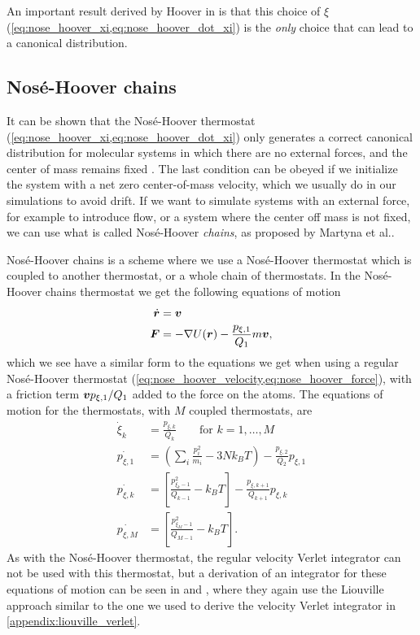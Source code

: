 An important result derived by Hoover in \cite{hoover1986constant} is that this choice of $\xi$ (\cref{eq:nose_hoover_xi,eq:nose_hoover_dot_xi}) is the \emph{only} choice that can lead to a canonical distribution.

\subsection{Nosé-Hoover chains\label{sec:nose_hoover_chain}}
It can be shown that the Nosé-Hoover thermostat (\cref{eq:nose_hoover_xi,eq:nose_hoover_dot_xi}) only generates a correct canonical distribution for molecular systems in which there are no external forces, and the center of mass remains fixed \cite[Appendix B.2.1]{frenkel2001understanding}\cite{hoover1985canonical}. The last condition can be obeyed if we initialize the system with a net zero center-of-mass velocity, which we usually do in our simulations to avoid drift. If we want to simulate systems with an external force, for example to introduce flow, or a system where the center off mass is not fixed, we can use what is called Nosé-Hoover \emph{chains}, as proposed by Martyna et al.\cite{martyna1992nose}. 

Nosé-Hoover chains is a scheme where we use a Nosé-Hoover thermostat which is coupled to another thermostat, or a whole chain of thermostats. In the Nosé-Hoover chains thermostat\cite{martyna1992nose} we get the following equations of motion
\begin{align*}
    \dot{\boldsymbol{r}} &= \boldsymbol{v} \\
    \boldsymbol{F} &= -\nabla U(\boldsymbol{r}) - \frac{p_{\xi,1}}{Q_1}m\boldsymbol{v},
\end{align*}
which we see have a similar form to the equations we get when using a regular Nosé-Hoover thermostat (\cref{eq:nose_hoover_velocity,eq:nose_hoover_force}), with a friction term $\boldsymbol{v} p_{\xi,1}/Q_1$ added to the force on the atoms. The equations of motion for the thermostats, with $M$ coupled thermostats, are
\begin{align*}
    \dot \xi_k &= \frac{p_{\xi,k}}{Q_k} \qquad\text{for } k = 1,\dots,M \\
    \dot{p_{\xi,1}} &= \left( \sum_i \frac{p_i^2}{m_i} - 3Nk_BT \right) - \frac{p_{\xi,2}}{Q_2} p_{\xi,1} \\
    \dot{p_{\xi,k}} &= \left[ \frac{p_{\xi_k-1}^2}{Q_{k-1}} - k_BT \right] - \frac{p_{\xi,k+1}}{Q_{k+1}}p_{\xi,k} \\
    \dot{p_{\xi,M}} &= \left[ \frac{p_{\xi_M-1}^2}{Q_{M-1}} - k_BT \right].
\end{align*}
As with the Nosé-Hoover thermostat, the regular velocity Verlet integrator can not be used with this thermostat, but a derivation of an integrator for these equations of motion can be seen in \cite[Appendix E.2.1]{frenkel2001understanding} and \cite{martyna1996explicit}, where they again use the Liouville approach similar to the one we used to derive the velocity Verlet integrator in \cref{appendix:liouville_verlet}.

